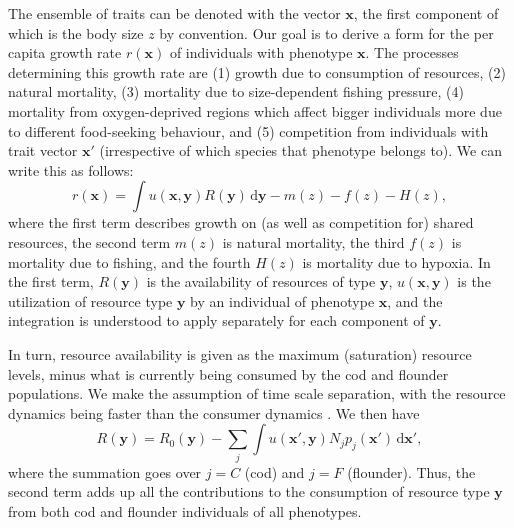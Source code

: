 \documentclass[9pt,twoside,lineno]{pnas-new}
\newcommand{\ud}{\text{d}}
\newcommand{\mat}[1]{\bm{#1}}
\begin{document}
The ensemble of traits can be denoted with the vector $\mat{x}$, the first component of which is the body size $z$ by convention. Our goal is to derive a form for the per capita growth rate $r(\mat{x})$ of individuals with phenotype $\mat{x}$. The processes determining this growth rate are (1) growth due to consumption of resources, (2) natural mortality, (3) mortality due to size-dependent fishing pressure, (4) mortality from oxygen-deprived regions which affect bigger individuals more due to different food-seeking behaviour, and (5) competition from individuals with trait vector $\mat{x}'$ (irrespective of which species that phenotype belongs to). We can write this as follows:
\begin{equation}
  \label{eq-r}
  r(\mat{x})
  = \int u(\mat{x}, \mat{y}) R(\mat{y}) \,\ud\mat{y}
  - m(z)
  - f(z)
  - H(z),
\end{equation}
where the first term describes growth on (as well as competition for) shared resources, the second term $m(z)$ is natural mortality, the third $f(z)$ is mortality due to fishing, and the fourth $H(z)$ is mortality due to hypoxia. In the first term, $R(\mat{y})$ is the availability of resources of type $\mat{y}$, $u(\mat{x}, \mat{y})$ is the utilization of resource type $\mat{y}$ by an individual of phenotype $\mat{x}$, and the integration is understood to apply separately for each component of $\mat{y}$.

In turn, resource availability is given as the maximum (saturation) resource levels, minus what is currently being consumed by the cod and flounder populations. We make the assumption of time scale separation, with the resource dynamics being faster than the consumer dynamics \cite{MacArthur1970, Pastore2021, Barabasetal2022}. We then have
\begin{equation}
  \label{eq-R}
  R(\mat{y})
  = R_0(\mat{y})
  - \sum_j \int u(\mat{x}', \mat{y})
  N_j p_j(\mat{x}') \,\ud\mat{x}',
\end{equation}
where the summation goes over $j = C$ (cod) and $j = F$ (flounder). Thus, the second term adds up all the contributions to the consumption of resource type $\mat{y}$ from both cod and flounder individuals of all phenotypes.
\end{document}
